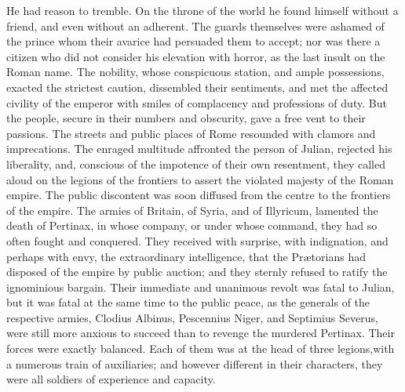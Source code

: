 
He had reason to tremble. On the throne of the world he found
himself without a friend, and even without an adherent. The
guards themselves were ashamed of the prince whom their avarice
had persuaded them to accept; nor was there a citizen who did not
consider his elevation with horror, as the last insult on the
Roman name. The nobility, whose conspicuous station, and ample
possessions, exacted the strictest caution, dissembled their
sentiments, and met the affected civility of the emperor with
smiles of complacency and professions of duty. But the people,
secure in their numbers and obscurity, gave a free vent to their
passions. The streets and public places of Rome resounded with
clamors and imprecations. The enraged multitude affronted the
person of Julian, rejected his liberality, and, conscious of the
impotence of their own resentment, they called aloud on the
legions of the frontiers to assert the violated majesty of the
Roman empire. The public discontent was soon diffused from the
centre to the frontiers of the empire. The armies of Britain, of
Syria, and of Illyricum, lamented the death of Pertinax, in whose
company, or under whose command, they had so often fought and
conquered. They received with surprise, with indignation, and
perhaps with envy, the extraordinary intelligence, that the
Prætorians had disposed of the empire by public auction; and they
sternly refused to ratify the ignominious bargain. Their
immediate and unanimous revolt was fatal to Julian, but it was
fatal at the same time to the public peace, as the generals of
the respective armies, Clodius Albinus, Pescennius Niger, and
Septimius Severus, were still more anxious to succeed than to
revenge the murdered Pertinax. Their forces were exactly
balanced. Each of them was at the head of three legions,\footnotemark[15] with
a numerous train of auxiliaries; and however different in their
characters, they were all soldiers of experience and capacity.


